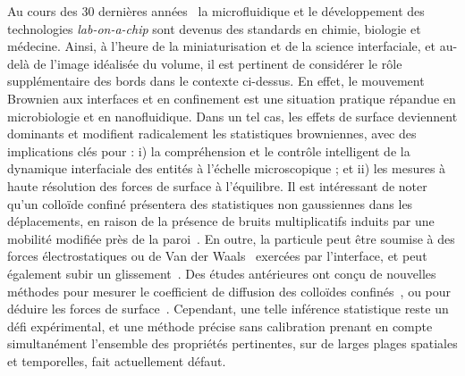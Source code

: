 Au cours des 30 dernières années~\cite{whitesides_origins_2006, convery_30_2019} la microfluidique et le développement des technologies \textit{lab-on-a-chip} \cite{neuzil_revisiting_2012,ding_surface_2013} sont devenus des standards en chimie, biologie et médecine. Ainsi, à l'heure de la miniaturisation et de la science interfaciale, et au-delà de l'image idéalisée du volume, il est pertinent de considérer le rôle supplémentaire des bords dans le contexte ci-dessus. En effet, le mouvement Brownien aux interfaces et en confinement est une situation pratique répandue en microbiologie et en nanofluidique. Dans un tel cas, les effets de surface deviennent dominants et modifient radicalement les statistiques browniennes, avec des implications clés pour : i) la compréhension et le contrôle intelligent de la dynamique interfaciale des entités à l'échelle microscopique ; et ii) les mesures à haute résolution des forces de surface à l'équilibre. Il est intéressant de noter qu'un colloïde confiné présentera des statistiques non gaussiennes dans les déplacements, en raison de la présence de bruits multiplicatifs induits par une mobilité modifiée près de la paroi~\cite{felderhof_effect_2005,wang_anomalous_2009,chechkin_brownian_2017}. En outre, la particule peut être soumise à des forces électrostatiques ou de Van der Waals~\cite{bouzigues_nanofluidics_2008} exercées par l'interface, et peut également subir un glissement~\cite{joly_probing_2006,mo_brownian_2017}. Des études antérieures ont conçu de nouvelles méthodes pour mesurer le coefficient de diffusion des colloïdes confinés~\cite{faucheux_confined_1994,dufresne_brownian_2001,carbajal-tinoco_asymmetry_2007,eral_anisotropic_2010,sharma_high-precision_2010, mo_broadband_2015,matse_test_2017}, ou pour déduire les forces de surface~\cite{prieve_measurement_1999,banerjee_experimental_2005,sainis_statistics_2007,volpe_influence_2010,wang_measurement_2011,li_subfemtonewton_2019}. Cependant, une telle inférence statistique reste un défi expérimental, et une méthode précise sans calibration prenant en compte simultanément l'ensemble des propriétés pertinentes, sur de larges plages spatiales et temporelles, fait actuellement défaut.

